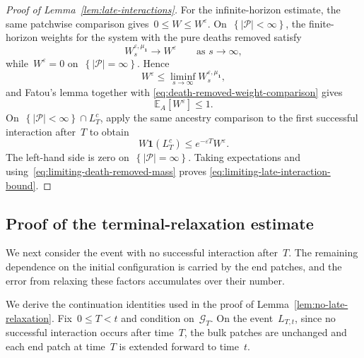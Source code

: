 \documentclass[EJP,preprint,NODS,nobera]{ejpecp}
\newcommand{\E}{\mathbb{E}}
\newcommand{\bb}[1]{\left(#1\right)}
\newcommand{\Cb}[1]{\left[#1\right]}
\newcommand{\cb}[1]{\left\{#1\right\}}
\newcommand{\abs}[1]{\left|#1\right|}
\newcommand{\ind}{\mathbf{1}}
\newcommand{\mb}[1]{\mathbf{#1}}
\newcommand{\rev}[1]{{\color{red}#1}}
\begin{document}
\begin{proof}[Proof of Lemma~\ref{lem:late-interactions}]
For the infinite-horizon estimate, the same patchwise comparison gives~$0\leq W\leq W^\varepsilon$. On~$\cb{\abs{\mathcal P}<\infty}$,
the finite-horizon weights for the system with the pure deaths removed satisfy
\begin{equation*}
W_s^{\varepsilon,\mu_{\mb 1}}
\longrightarrow
W^\varepsilon
\qquad
\text{as }s\to\infty,
\end{equation*}
while~$W^\varepsilon=0$ on~$\cb{\abs{\mathcal P}=\infty}$. Hence
\begin{equation*}
W^\varepsilon
\leq
\liminf_{s\to\infty}
W_s^{\varepsilon,\mu_{\mb 1}},
\end{equation*}
and Fatou's lemma together with
\eqref{eq:death-removed-weight-comparison} gives
\begin{equation}
\label{eq:limiting-death-removed-mass}
\E_A\Cb{W^\varepsilon}
\leq1.
\end{equation}
On~$\cb{\abs{\mathcal P}<\infty}\cap L_T^c$, apply the same ancestry
comparison to the first successful interaction after~$T$ to obtain
\begin{equation*}
W\ind\bb{L_T^c}
\leq
e^{-\varepsilon T}W^\varepsilon.
\end{equation*}
The left-hand side is zero on~$\cb{\abs{\mathcal P}=\infty}$. Taking
expectations and using~\eqref{eq:limiting-death-removed-mass} proves
\eqref{eq:limiting-late-interaction-bound}.
\end{proof}

\subsection{\texorpdfstring{\rev{Proof of the terminal-relaxation estimate}}{Proof of the terminal-relaxation estimate}}
\label{subsec:terminal-relaxation}

We next consider the event with no successful interaction after~$T$. The
remaining dependence on the initial configuration is carried by the end
patches, and the error from relaxing these factors accumulates over their
number.



We derive the continuation identities used in the proof of
Lemma~\ref{lem:no-late-relaxation}. Fix~$0\leq T<t$ and condition on~$\mathcal G_T$. On the event~$L_{T,t}$, since no successful interaction occurs after time~$T$, the bulk
patches are unchanged and each end patch at time~$T$ is extended forward to time~$t$.
\end{document}
